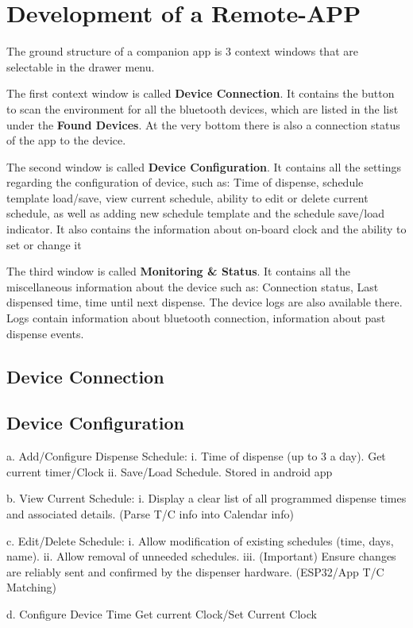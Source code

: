 \section{Development of a Remote-APP}\label{sec:FrontendDev}
The ground structure of a companion app is 3 context windows that are selectable in the drawer menu. 

The first context window is called \textbf{Device Connection}. It contains the button to scan the environment for all the bluetooth devices, which are listed in the list under the \textbf{Found Devices}. At the very bottom there is also a connection status of the app to the device.

The second window is called \textbf{Device Configuration}. It contains all the settings regarding the configuration of device, such as: Time of dispense, schedule template load/save, view current schedule, ability to edit or delete current schedule, as well as adding new schedule template and the schedule save/load indicator. It also contains the information about on-board clock and the ability to set or change it


The third window is called \textbf{Monitoring \& Status}. It contains all the miscellaneous information about the device such as: Connection status, Last dispensed time, time until next dispense. The device logs are also available there. Logs contain information about bluetooth connection, information about past dispense events.

\subsection{Device Connection}
\subsection{Device Configuration}
  a. Add/Configure Dispense Schedule:
  i. Time of dispense (up to 3 a day). Get current timer/Clock
  ii. Save/Load Schedule. Stored in android app
  
  b. View Current Schedule:
  i. Display a clear list of all programmed dispense times and associated details. (Parse T/C info into Calendar info)
  
  c. Edit/Delete Schedule:
  i. Allow modification of existing schedules (time, days, name).
  ii. Allow removal of unneeded schedules.
  iii. (Important) Ensure changes are reliably sent and confirmed by the dispenser hardware. (ESP32/App T/C Matching)
  
  d. Configure Device Time Get current Clock/Set Current Clock
  
